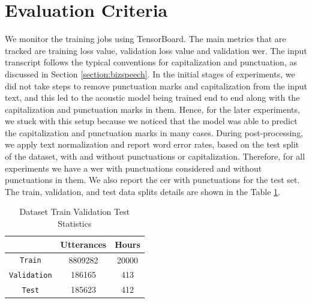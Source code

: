 \section{Evaluation Criteria}
\label{section:eval}
We monitor the training jobs using TensorBoard. The main metrics that are tracked are training loss value, validation loss value and validation \acrshort{wer}. The input transcript follows the typical conventions for capitalization and punctuation, as discussed in Section \ref{section:bizspeech}. In the initial stages of experiments, we did not take steps to remove punctuation marks and capitalization from the input text, and this led to the acoustic model being trained end to end along with the capitalization and punctuation marks in them. Hence, for the later experiments, we stuck with this setup because we noticed that the model was able to predict the capitalization and punctuation marks in many cases. During post-processing, we apply text normalization and report word error rates, based on the test split of the dataset, with and without punctuations or capitalization. Therefore, for all experiments we have a \acrshort{wer} with punctuations considered and without punctuations in them. We also report the \acrlong{cer} with punctuations for the test set. The train, validation, and test data splits details are shown in the Table \ref{table:splits}.

\begin{table}[ht]
\centering
\begin{tabular}{ c | c  c }
\hline
  & Utterances & Hours \\
 \hline
 \verb|Train| & 8809282 & 20000 \\ 
 \verb|Validation| & 186165 & 413 \\ 
 \verb|Test| & 185623 & 412 \\ 
 \hline
\end{tabular}
\caption{\label{table:splits}Dataset Train Validation Test Statistics }
\end{table}

